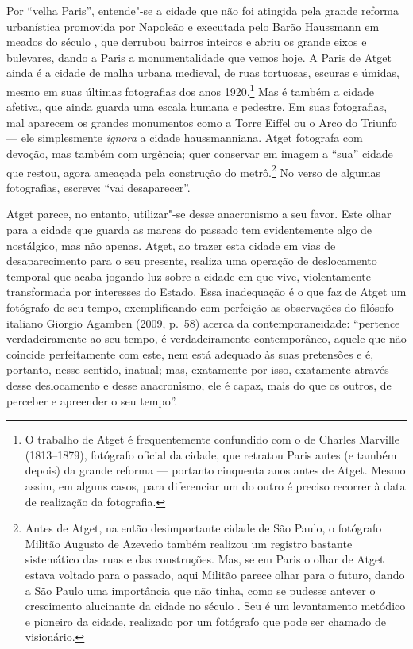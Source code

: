 Por ``velha Paris'', entende"-se a cidade que não foi atingida pela
grande reforma urbanística promovida por Napoleão  e executada pelo
Barão Haussmann em meados do século , que derrubou bairros inteiros e
abriu os grande eixos e bulevares, dando a Paris a monumentalidade que
vemos hoje. A Paris de Atget ainda é a cidade de malha urbana medieval,
de ruas tortuosas, escuras e úmidas, mesmo em suas últimas fotografias
dos anos 1920.\footnote{O trabalho de Atget é frequentemente confundido
  com o de Charles Marville (1813--1879), fotógrafo oficial da cidade, que
  retratou Paris antes (e também depois) da grande reforma --- portanto
  cinquenta anos antes de Atget. Mesmo assim, em alguns casos, para
  diferenciar um do outro é preciso recorrer à data de realização da
  fotografia.} Mas é também a cidade afetiva, que ainda guarda uma
escala humana e pedestre. Em suas fotografias, mal aparecem os grandes
monumentos como a Torre Eiffel ou o Arco do Triunfo --- ele simplesmente
\emph{ignora} a cidade haussmanniana. Atget fotografa com devoção, mas
também com urgência; quer conservar em imagem a ``sua'' cidade que
restou, agora ameaçada pela construção do metrô.\footnote{Antes de
  Atget, na então desimportante cidade de São Paulo, o fotógrafo Militão
  Augusto de Azevedo também realizou um registro bastante sistemático
  das ruas e das construções. Mas, se em Paris o olhar de Atget estava
  voltado para o passado, aqui Militão parece olhar para o futuro, dando
  a São Paulo uma importância que não tinha, como se pudesse antever o
  crescimento alucinante da cidade no século . Seu {} é um levantamento
  metódico e pioneiro da cidade, realizado por um fotógrafo que pode ser
  chamado de visionário.} No verso de algumas fotografias, escreve:
``vai desaparecer''.

Atget parece, no entanto, utilizar"-se desse anacronismo a seu favor.
Este olhar para a cidade que guarda as marcas do passado tem
evidentemente algo de nostálgico, mas não apenas. Atget, ao trazer esta
cidade em vias de desaparecimento para o seu presente, realiza uma
operação de deslocamento temporal que acaba jogando luz sobre a cidade
em que vive, violentamente transformada por interesses do Estado. Essa
inadequação é o que faz de Atget um fotógrafo de seu tempo,
exemplificando com perfeição as observações do filósofo italiano Giorgio
Agamben (2009, p.~58) acerca da contemporaneidade: ``pertence
verdadeiramente ao seu tempo, é verdadeiramente contemporâneo, aquele
que não coincide perfeitamente com este, nem está adequado às suas
pretensões e é, portanto, nesse sentido, inatual; mas, exatamente por
isso, exatamente através desse deslocamento e desse anacronismo, ele é
capaz, mais do que os outros, de perceber e apreender o seu tempo''.

